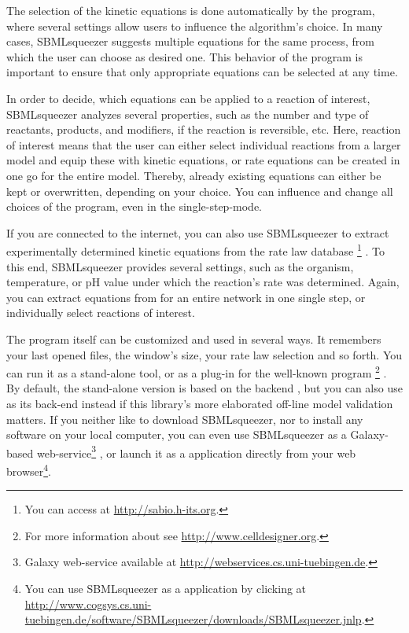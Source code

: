 The selection of the kinetic equations is done automatically by the program,
where several settings allow users to influence the algorithm's choice.
In many cases, SBMLsqueezer suggests multiple equations for the same process,
from which the user can choose as desired one.
This behavior of the program is important to ensure that only appropriate
equations can be selected at any time.

In order to decide, which equations can be applied to a reaction of interest,
SBMLsqueezer analyzes several properties, such as the number and type of
reactants, products, and modifiers, if the reaction is reversible, etc.
Here, reaction of interest means that the user can either select individual
reactions from a larger model and equip these with kinetic equations, or rate
equations can be created in one go for the entire model.
Thereby, already existing equations can either be kept or overwritten, depending
on your choice.
You can influence and change all choices of the program, even in the single-step-mode.

If you are connected to the internet, you can also use SBMLsqueezer to extract
experimentally determined kinetic equations from the rate law database
\SABIO\footnote{You can access \SABIO at \url{http://sabio.h-its.org}.}
\citep{Wittig2006, Rojas2007, Krebs2007, Wittig2012}.
To this end, SBMLsqueezer provides several settings, such as the organism,
temperature, or pH value under which the reaction's rate was determined. Again,
you can extract equations from \SABIO for an entire network in one single step, or
individually select reactions of interest.

The program itself can be customized and used in several ways. It remembers your
last opened files, the window's size, your rate law selection and so forth.
You can run it as a stand-alone tool, or as a plug-in for the well-known program
\CellDesigner\footnote{For more information about \CellDesigner see \url{http://www.celldesigner.org}.}
\citep{Funahashi2003, Funahashi2006, Funahashi2007a, Funahashi2008}.
By default, the stand-alone version is based on the \JSBML backend 
\citep{Draeger2011b}, but you can also use \libSBML \citep{Bornstein2008} as its
\SBML back-end instead if this library's more elaborated off-line model validation
matters.
If you neither like to download SBMLsqueezer, nor to install any software on
your local computer, you can even use SBMLsqueezer as a Galaxy-based
web-service\footnote{Galaxy web-service available at \url{http://webservices.cs.uni-tuebingen.de}.} \citet{Goecks2010},
or launch it as a \JavaWebStart application directly from your web
browser\footnote{You can use SBMLsqueezer as a \JavaWebStart application by
clicking at \url{http://www.cogsys.cs.uni-tuebingen.de/software/SBMLsqueezer/downloads/SBMLsqueezer.jnlp}.}.

